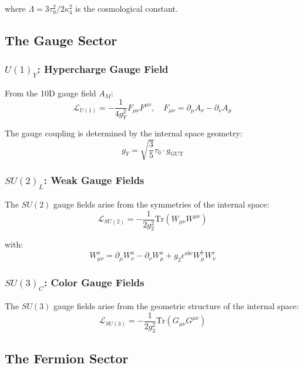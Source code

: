 where $\Lambda = 3\tau_0^2/2\kappa_4^2$ is the cosmological constant.

\subsection{The Gauge Sector}

\subsubsection{$U(1)_Y$: Hypercharge Gauge Field}

From the 10D gauge field $A_M$:
\begin{equation}
    \mathcal{L}_{U(1)} = -\frac{1}{4g_Y^2}F_{\mu\nu}F^{\mu\nu}, \quad F_{\mu\nu} = \partial_\mu A_\nu - \partial_\nu A_\mu
\end{equation}

The gauge coupling is determined by the internal space geometry:
\begin{equation}
    g_Y = \sqrt{\frac{3}{5}}\tau_0 \cdot g_{\text{GUT}}
\end{equation}

\subsubsection{$SU(2)_L$: Weak Gauge Fields}

The $SU(2)$ gauge fields arise from the symmetries of the internal space:
\begin{equation}
    \mathcal{L}_{SU(2)} = -\frac{1}{2g_2^2}\text{Tr}(W_{\mu\nu}W^{\mu\nu})
\end{equation}

with:
\begin{equation}
    W_{\mu\nu}^a = \partial_\mu W_\nu^a - \partial_\nu W_\mu^a + g_2\epsilon^{abc}W_\mu^b W_\nu^c
\end{equation}

\subsubsection{$SU(3)_C$: Color Gauge Fields}

The $SU(3)$ gauge fields arise from the geometric structure of the internal space:
\begin{equation}
    \mathcal{L}_{SU(3)} = -\frac{1}{2g_3^2}\text{Tr}(G_{\mu\nu}G^{\mu\nu})
\end{equation}

\subsection{The Fermion Sector}

